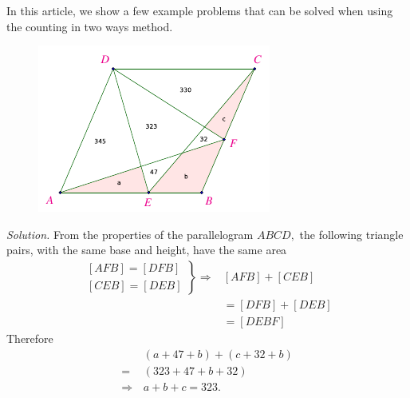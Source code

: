 \begin{multicols}{2}
		In this article, we show a few example problems that can be solved when using the counting in two ways method.
		\vskip 0.2cm
		\begin{figure}[H]
			\centering
			\vspace*{-5pt}
			\captionsetup{labelformat= empty, justification=centering}
			\includegraphics[width=1\linewidth]{hc-2022-2-2-6.pdf}
			\vspace*{-10pt}
		\end{figure}
		\textit{Solution.}
		From the properties of the parallelogram $ABCD,$ the following triangle pairs, with the same base and height, have the same area
		\begin{align*}
			\left.
			\begin{aligned}
				[AFB] = [DFB]\\
				[CEB] = [DEB]
			\end{aligned}
			\right\}
			\Rightarrow& [AFB] + [CEB] \\
			&= [DFB] + [DEB] \\
			&= [DEBF]
		\end{align*}
		Therefore
		\begin{align*}
			&(a + 47 + b) + (c + 32 + b)\\
			= \,&(323 + 47 + b + 32)\\
			\Rightarrow\, &a + b + c = 323.
		\end{align*}
		\vspace*{0.1pt}
		

\end{multicols}
